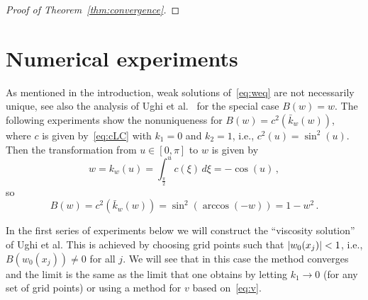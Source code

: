 \documentclass[11pt,leqno]{amsart}
\newcommand{\pt}[1]{#1_t}
\newcommand{\px}[1]{#1_x }
\renewcommand{\H}{H}
\DeclarePairedDelimiter\abs{\lvert}{\rvert}
\begin{document}
\begin{proof}[Proof of Theorem~\ref{thm:convergence}]
\end{proof}
\section{Numerical experiments}\label{sec:numerics}
As mentioned in the introduction, weak solutions of~\eqref{eq:weq} are not necessarily unique, see also the analysis of Ughi et al.~\cite{Ughi1984,DalPassoLuckhaus1987,BertschDalPassoUghi1992} for the special case $B(w)=w$. The following experiments show the nonuniqueness for $B(w)=c^2(\bar{k}_w(w))$, where $c$ is given by~\eqref{eq:cLC} with $k_1=0$ and $k_2=1$, i.e., $c^2(u)=\sin^2(u)$. Then the transformation from $u\in [0,\pi]$ to $w$ is given by
\begin{equation*}
  w=k_w(u)=\int_{\frac{\pi}{2} }^{u} c(\xi)\, d\xi=-\cos(u)\,,
\end{equation*}
so 
\begin{equation*}
  B(w)=c^2(\bar{k}_w(w))=\sin^2(\arccos(-w))=1-w^2\,.
\end{equation*}

In the first series of experiments below we will construct the ``viscosity solution'' of Ughi et al. This is achieved by choosing grid points such that $\abs{w_0(x_j)}<1$, i.e., $B(w_0(x_j))\neq 0$ for all $j$. We will see that in this case the method converges and the limit is the same as the limit that one obtains by letting $k_1\rightarrow 0$ (for any set of grid points) or using a method for $v$ based on~\eqref{eq:v}.
\end{document}
